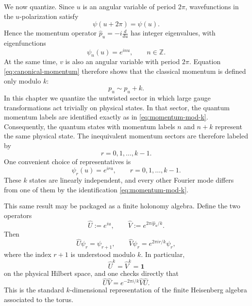 \documentclass[11pt]{article}
\newcommand{\Z}{\mathbb{Z}}
\theoremstyle{definition}
\numberwithin{theorem}{section}
\numberwithin{equation}{section}
\begin{document}
\noindent We now quantize. Since $u$ is an angular variable of period $2\pi$, wavefunctions in the $u$-polarization satisfy
\begin{equation*}
\psi(u+2\pi) = \psi(u).
\end{equation*}
Hence the momentum operator $\hat p_u = -i\frac{d}{du}$ has integer eigenvalues, with eigenfunctions
\begin{equation}\label{eq:torus-basis-functions}
\psi_n(u) = e^{inu},
\qquad
n\in \Z.
\end{equation}
At the same time, $v$ is also an angular variable with period $2\pi$. Equation \eqref{eq:canonical-momentum} therefore shows that the classical momentum is defined only modulo $k$:
\begin{equation}\label{eq:momentum-mod-k}
p_u \sim p_u + k.
\end{equation}
In this chapter we quantize the untwisted sector in which large gauge transformations act trivially on physical states. In that sector, the quantum momentum labels are identified exactly as in \eqref{eq:momentum-mod-k}.
Consequently, the quantum states with momentum labels $n$ and $n+k$ represent the same physical state. The inequivalent momentum sectors are therefore labeled by
\begin{equation*}
r = 0,1,\ldots,k-1.
\end{equation*}
One convenient choice of representatives is
\begin{equation}\label{eq:torus-basis}
\psi_r(u) = e^{iru},
\qquad
r=0,1,\ldots,k-1.
\end{equation}
These $k$ states are linearly independent, and every other Fourier mode differs from one of them by the identification \eqref{eq:momentum-mod-k}.

\medskip

\noindent This same result may be packaged as a finite holonomy algebra. Define the two operators
\begin{equation}\label{eq:torus-UV}
\hat U := e^{iu},
\qquad
\hat V := e^{2\pi i \hat p_u/k}.
\end{equation}
Then
\begin{equation*}
\hat U\psi_r = \psi_{r+1},
\qquad
\hat V\psi_r = e^{2\pi i r/k}\psi_r,
\end{equation*}
where the index $r+1$ is understood modulo $k$. In particular,
\begin{equation*}
\hat U^k = \hat V^k = \mathbf{1}
\end{equation*}
on the physical Hilbert space, and one checks directly that
\begin{equation*}
\hat U\hat V = e^{-2\pi i/k}\hat V\hat U.
\end{equation*}
This is the standard $k$-dimensional representation of the finite Heisenberg algebra associated to the torus.
\end{document}
